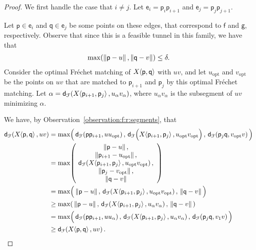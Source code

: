 \documentclass[12pt]{article}
\newcommand{\obsref}[1]{Observation~\ref{observation:#1}}
\newcommand{\ts}{\hspace{0.6pt}}
\newcommand{\Frechet}{Fr\'{e}c{h}e{}t\xspace}\providecommand{\Arr}{\mathop{\mathrm{\EuScript{A}}}}
\newcommand{\distFr}[2]{\mathsf{d}_{\EuScript{F}}\pth{#1, #2}}
\newcommand{\distX}[2]{\distCmd{#1 - #2}}
\newcommand{\pnt}{\mathsf{p}}
\newcommand{\pntA}{\mathsf{q}}
\newcommand{\pntF}{\mathsf{f}}
\newcommand{\pntG}{\mathsf{g}}
\newcommand{\opt}{\mathrm{opt}}
\newcommand{\SimplifyX}[1]{#1}
\newcommand{\cXBase}{X} \newcommand{\cYBase}{Y} \newcommand{\crvCBase}{{\pi}}
\newcommand{\cX}{\SimplifyX{\cXBase}}
\providecommand{\pth}[2][\!]{#1\left({#2}\right)}
\providecommand{\MakeSBig}{\rule[0.0cm]{0.0cm}{0.35cm}}
\newcommand{\SC}[3]{{#1}\!\!\ts\ts \left\langle  #2, #3 \right\rangle}
\newcommand{\edge}{\mathsf{e}}
\newcommand{\tunnel}{tunnel\xspace}
\numberwithin{figure}{section}
\numberwithin{equation}{section}
\begin{document}
\begin{proof}
    We first handle the case that $i \neq j$.  Let $\edge_i = \pnt_i
    \pnt_{i+1}$ and $\edge_j = \pnt_j \pnt_{j+1}$.
    
    
    
    Let $\pnt \in \edge_i$ and $\pntA \in \edge_j$ be some points on
    these edges, that correspond to $\pntF$ and $\pntG$, respectively.
    Observe that since this is a feasible \tunnel in this family, we
    have that
    \begin{align*}
        \max \pth{ \distX{\pnt}{u}, \distX{\pntA}{v} } \leq \delta.
    \end{align*}
    Consider the optimal \Frechet matching of $\SC{\cX}{\pnt}{\pntA}$
    with $u v$, and let $u_\opt$ and $v_\opt$ be the points on $uv$
    that are matched to $\pnt_{i+1}$ and $\pnt_{j}$ by this optimal
    \Frechet matching.  Let $\alpha =
    \distFr{\SC{\cX}{\pnt_{i+1}}{\pnt_j}}{u_\alpha v_\alpha}$, where
    $u_\alpha v_\alpha$ is the subsegment of $uv$ minimizing $\alpha$.
    
    We have, by \obsref{f:r:segments}, that
    \begin{align*}
        \distFr{\SC{\cX}{\pnt}{\pntA}}{uv} &=\max\pth{\, \distFr{\pnt \pnt_{i+1}}{u {} u_\opt},\,\distFr{ \MakeSBig \SC{\cX}{\pnt_{i+1}}{\pnt_j}}{u_{\opt}
              v_{\opt}},\,\distFr{\pnt_{j} \pntA}{v_\opt v}\, }
\\
        &=\max {\pth{\MakeSBig\!\begin{array}{c}
                  \distX{\pnt}{u},\\
                  \distX{\pnt_{i+1}}{u_\opt},\\
              \distFr{\SC{\cX}{\pnt_{i+1}}{\pnt_j}}{u_{\opt}
                 v_{\opt}},\\
              \distX{\pnt_{j}}{v_\opt},\\
              \distX{\pntA}{v}
              \end{array}
           }}
        \\
        &= \max {\pth{\, \MakeSBig\!\distX{\pnt}{u},\,\distFr{\SC{\cX}{\pnt_{i+1}}{\pnt_j}}{u_{\opt}
                 v_{\opt}},\,\distX{\pntA}{v} \, }}
\\
        &\geq \max \pth{\,\distX{\pnt}{u}, \,\distFr{\SC{\cX}{\pnt_{i+1}}{\pnt_{j}}} {u_\alpha
              v_\alpha},\,\distX{\pntA}{v}\,}\\
        &=\max\pth{\, \MakeSBig \distFr{\pnt \pnt_{i+1}}{u {} u_\alpha},\,\distFr{\SC{\cX}{\pnt_{i+1}}{\pnt_{j}}} {u_\alpha
              v_\alpha},\,\distFr{\pnt_{j} \pntA}{v_1 v}\, }
        \\
        &\geq \distFr{\SC{\cX}{\pnt}{\pntA}}{uv}.
    \end{align*}


\end{proof}
\end{document}
